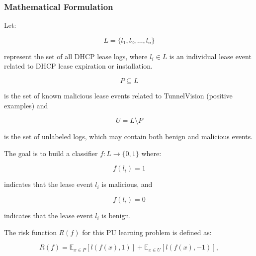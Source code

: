 \documentclass[conference]{IEEEtran}
\begin{document}
        \subsubsection{Mathematical Formulation}
        
            Let:
            
            \begin{equation}
                L = \{l_1, l_2, \dots, l_n\}
            \end{equation}
            
            represent the set of all DHCP lease logs, where \(l_i \in L\) is an individual lease event related to DHCP lease expiration or installation.
            
            \begin{equation}
                P \subseteq L
            \end{equation}
            
            is the set of known malicious lease events related to TunnelVision (positive examples) and
            
            \begin{equation}
                U = L \setminus P
            \end{equation}
            
            is the set of unlabeled logs, which may contain both benign and malicious events.
            
            The goal is to build a classifier \(f: L \to \{0, 1\}\) where:
            
            \begin{equation}
                f(l_i) = 1
            \end{equation}
            
            indicates that the lease event \(l_i\) is malicious, and
            
            \begin{equation}
                f(l_i) = 0
            \end{equation}
            
            indicates that the lease event \(l_i\) is benign.
            
            The risk function \(R(f)\) for this PU learning problem is defined as:
            
            \begin{equation}
                R(f) = \mathbb{E}_{x \in P} [l(f(x), 1)] + \mathbb{E}_{x \in U} [l(f(x), -1)],
            \end{equation}
            
\end{document}
